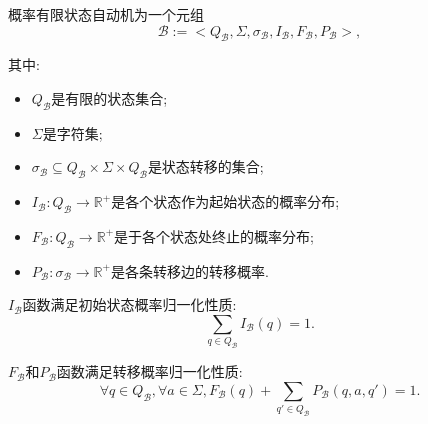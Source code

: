             \begin{definition}
                \label{def.pfsa}
                概率有限状态自动机为一个元组
                \begin{equation}
                    \mathcal{B} := <Q_{\mathcal{B}}, \Sigma, \sigma_{\mathcal{B}}, I_{\mathcal{B}}, F_{\mathcal{B}}, P_{\mathcal{B}}>,
                \end{equation}
                
                其中:
                \begin{itemize}
                    \item $Q_{\mathcal{B}}$是有限的状态集合;
                    
                    \item $\Sigma$是字符集;
                    
                    \item $\sigma_{\mathcal{B}} \subseteq Q_{\mathcal{B}} \times \Sigma \times Q_{\mathcal{B}}$是状态转移的集合;
                    
                    \item $I_{\mathcal{B}} : Q_{\mathcal{B}} \to \mathbb{R}^{+}$是各个状态作为起始状态的概率分布;
                    
                    \item $F_{\mathcal{B}}: Q_{\mathcal{B}} \to \mathbb{R}^{+}$是于各个状态处终止的概率分布;
                    
                    \item $P_{\mathcal{B}} : \sigma_{\mathcal{B}} \to \mathbb{R}^{+}$是各条转移边的转移概率.
                \end{itemize}
                
                $I_{\mathcal{B}}$函数满足初始状态概率归一化性质:
                \begin{equation}
                    \sum_{q \in Q_{\mathcal{B}}} I_{\mathcal{B}}(q) = 1.
                \end{equation}
                
                $F_{\mathcal{B}}$和$P_{\mathcal{B}}$函数满足转移概率归一化性质:
                \begin{equation}
                    \forall q \in Q_{\mathcal{B}}, \forall a \in \Sigma, F_{\mathcal{B}}(q) + \sum_{q' \in Q_{\mathcal{B}}} P_{\mathcal{B}}(q,a,q') = 1.
                \end{equation}
            \end{definition}
            
